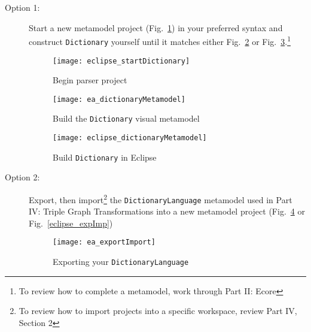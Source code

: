 \begin{description}

\item[Option 1:] Start a new metamodel project (Fig.~\ref{fig:startDictLang}) in your preferred syntax and construct \texttt{Dictionary} yourself until it
matches either Fig.~\ref{ea_dictLang} or Fig.~\ref{eclipse_dictLang}.\footnote{To review how to complete a metamodel, work through Part II: Ecore}

\begin{figure}[htbp]
\begin{center}
  \texttt{[image: eclipse\_startDictionary]}
  \caption{Begin parser project}
  \label{fig:startDictLang}
\end{center}
\end{figure}

\newpage

\vspace*{1cm}

\begin{figure}[htb]
\begin{center}
  \texttt{[image: ea\_dictionaryMetamodel]}
  \caption{Build the \texttt{Dictionary} visual metamodel}
  \label{ea_dictLang}
\end{center}
\end{figure}

\vspace{1cm}

\begin{figure}[htb]
\begin{center}
  \texttt{[image: eclipse\_dictionaryMetamodel]}
  \caption{Build \texttt{Dictionary} in Eclipse}
  \label{eclipse_dictLang}
\end{center}
\end{figure}

\newpage


\item[Option 2:] Export, then import\footnote{To review how to import projects into a specific workspace, review Part IV, Section 2} the
\texttt{DictionaryLanguage} metamodel used in Part IV: Triple Graph Transformations into a new metamodel project (Fig.~\ref{ea_expImp} or
Fig.~\ref{eclipse_expImp})

\vspace{0.5cm}

\begin{figure}[htbp]
\begin{center}
  \texttt{[image: ea\_exportImport]}
  \caption{Exporting your \texttt{DictionaryLanguage}}
  \label{ea_expImp}
\end{center}
\end{figure}


\end{description}
